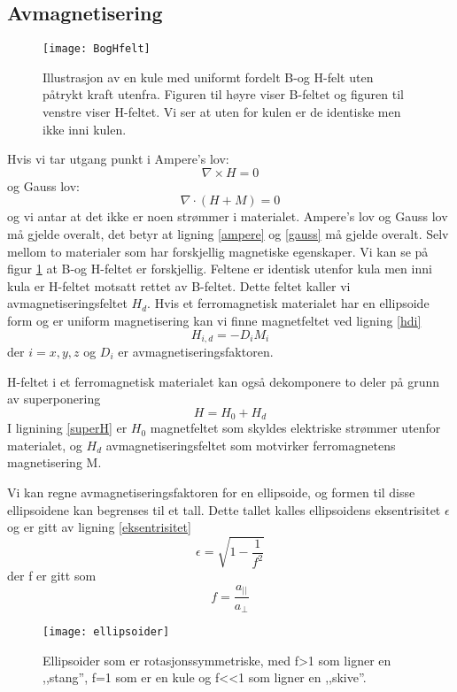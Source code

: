 \documentclass[norsk,a4paper,12pt]{article}
\begin{document}
\subsection{Avmagnetisering}
\begin{figure}
  	\begin{center}
   	\texttt{[image: BogHfelt]}
  	\caption[B- og H-felt for en uniformt magnetisert kule uten påtrykt felt.]{Illustrasjon av en kule med uniformt fordelt B-og H-felt uten påtrykt kraft utenfra. Figuren til høyre viser B-feltet og figuren til venstre viser H-feltet. Vi ser at uten for kulen er de identiske men ikke inni kulen.}
	\label{HB}
  	\end{center}
\end{figure}
Hvis vi tar utgang punkt i Ampere's lov: 
\begin{equation}
\nabla \times H = 0
\label{ampere}
\end{equation}
og Gauss lov:
\begin{equation}
\nabla \cdot(H+M) = 0
\label{gauss}
\end{equation}
og vi antar at det ikke er noen strømmer i materialet. Ampere's lov og Gauss lov må gjelde overalt, det betyr at ligning \vref{ampere} og \vref{gauss} må gjelde overalt. Selv mellom to materialer som har forskjellig magnetiske egenskaper. Vi kan se på figur \ref{HB} at B-og H-feltet er forskjellig. Feltene er identisk utenfor kula men inni kula er H-feltet motsatt rettet av B-feltet. Dette feltet kaller vi avmagnetiseringsfeltet $H_d$. 
Hvis et ferromagnetisk materialet har en ellipsoide form og er uniform magnetisering kan vi finne magnetfeltet ved ligning \ref{hdi}
\begin{equation}
H_{i,d} = -D_iM_i 
\label{hdi}
\end{equation}
der $i=x,y,z$ og $D_i$ er avmagnetiseringsfaktoren.
 
H-feltet i et ferromagnetisk materialet kan også dekomponere to deler på grunn av superponering
\begin{equation}
H = H_0 + H_d
\label{superH}
\end{equation}
I lignining \vref{superH} er $H_0$ magnetfeltet som skyldes elektriske strømmer utenfor materialet, og $H_d$ avmagnetiseringsfeltet som motvirker ferromagnetens magnetisering M.

Vi kan regne avmagnetiseringsfaktoren for en ellipsoide, og formen til disse ellipsoidene kan begrenses til et tall. Dette tallet kalles ellipsoidens eksentrisitet $\epsilon$ og er gitt av ligning \vref{eksentrisitet}
\begin{equation}
\epsilon = \sqrt{1 - \frac{1}{f^2}}
\label{eksentrisitet}
\end{equation}
der f er gitt som
$$
f = \frac{a_{||}}{a_\bot}
$$
\begin{wrapfigure}{r}{0.5\textwidth}
  \begin{center}
    \texttt{[image: ellipsoider]}
  \end{center}
  \caption[Ellipsoider]{Ellipsoider som er rotasjonssymmetriske, med f>1 som ligner en ,,stang'', f=1 som er en kule og f<<1 som ligner en ,,skive''.}
  \label{ellipsoider}
\end{wrapfigure}
\end{document}
